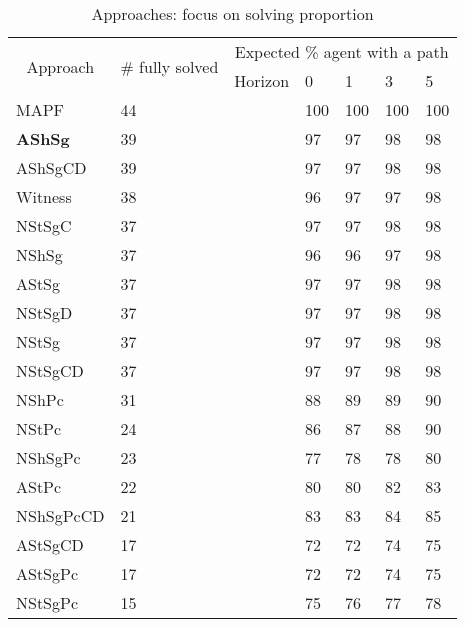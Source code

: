 \begin{table}[H]
\begin{center}
\caption{Approaches: focus on solving proportion}
\label{tbl:path_proportion}
\begin{tabular}{@{}lllllll@{}}
\toprule
 \multicolumn{1}{c}{\multirow{2}{*}{Approach}} & \multirow{2}{*}{\# fully solved} & \multicolumn{5}{c}{Expected \% agent with a path} \\ \cmidrule(l){3-7}  
\multicolumn{1}{c}{} &  & \multicolumn{1}{l|}{Horizon} & 0 & 1 & 3 & 5 \\ \midrule
MAPF & 44 & \cellcolor{lightgrey} & 100 & 100 & 100 & 100  \\
\textbf{AShSg} & 39 & \cellcolor{lightgrey} & 97 & 97 & 98 & 98  \\
AShSgCD & 39 & \cellcolor{lightgrey} & 97 & 97 & 98 & 98  \\
Witness & 38 & \cellcolor{lightgrey} & 96 & 97 & 97 & 98  \\
NStSgC & 37 & \cellcolor{lightgrey} & 97 & 97 & 98 & 98  \\
NShSg & 37 & \cellcolor{lightgrey} & 96 & 96 & 97 & 98  \\
AStSg & 37 & \cellcolor{lightgrey} & 97 & 97 & 98 & 98  \\
NStSgD & 37 & \cellcolor{lightgrey} & 97 & 97 & 98 & 98  \\
NStSg & 37 & \cellcolor{lightgrey} & 97 & 97 & 98 & 98  \\
NStSgCD & 37 & \cellcolor{lightgrey} & 97 & 97 & 98 & 98  \\
NShPc & 31 & \cellcolor{lightgrey} & 88 & 89 & 89 & 90  \\
NStPc & 24 & \cellcolor{lightgrey} & 86 & 87 & 88 & 90  \\
NShSgPc & 23 & \cellcolor{lightgrey} & 77 & 78 & 78 & 80  \\
AStPc & 22 & \cellcolor{lightgrey} & 80 & 80 & 82 & 83  \\
NShSgPcCD & 21 & \cellcolor{lightgrey} & 83 & 83 & 84 & 85  \\
AStSgCD & 17 & \cellcolor{lightgrey} & 72 & 72 & 74 & 75  \\
AStSgPc & 17 & \cellcolor{lightgrey} & 72 & 72 & 74 & 75  \\
NStSgPc & 15 & \cellcolor{lightgrey} & 75 & 76 & 77 & 78  \\
\end{tabular}
\end{center}
\end{table}
